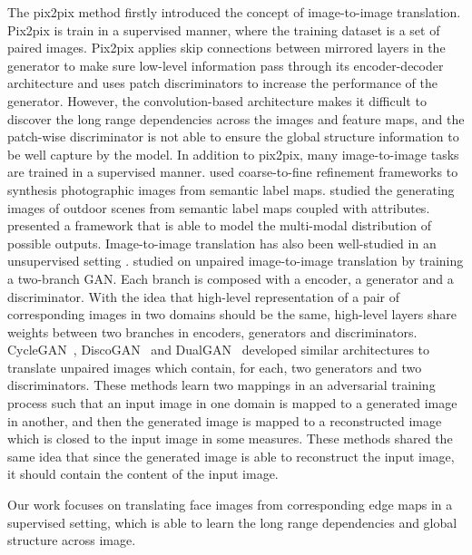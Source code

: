 The pix2pix method \cite{pix2pix} firstly introduced the concept of image-to-image translation. Pix2pix is train in a supervised manner, where the training dataset is a set of paired images. 
Pix2pix applies skip connections \cite{Unet} between mirrored layers in the generator to make sure low-level information pass through its encoder-decoder architecture and uses patch discriminators \cite{PatchDicriminator} to increase the performance of the generator. However, the convolution-based architecture makes it difficult to discover the long range dependencies across the images and feature maps, and the patch-wise discriminator is not able to ensure the global structure information to be well capture by the model.
%
In addition to pix2pix, many image-to-image tasks \cite{See pix2pixHD} are trained in a supervised manner. 
\cite{CascadedGANs, pix2pixHD} used coarse-to-fine refinement frameworks to synthesis photographic images from semantic label maps. 
\cite{pix2pixHD-25} studied the generating images of outdoor scenes from semantic label maps coupled with attributes.
\cite{BicycleGANs} presented a framework that is able to model the multi-modal distribution of possible outputs.
%
%
Image-to-image translation has also been well-studied in an unsupervised setting \cite{See pix2pixHD}.
\cite{UNIT} studied on unpaired image-to-image translation by training a two-branch GAN. Each branch is composed with a encoder, a generator and a discriminator. With the idea that high-level representation of a pair of corresponding images in two domains should be the same, high-level layers share weights between two branches in encoders, generators and discriminators. 
%
CycleGAN~\cite{CycleGAN}, DiscoGAN~\cite{DiscoGAN} and DualGAN~\cite{DualGAN} developed similar architectures to translate unpaired images which contain, for each, two generators and two discriminators. These methods learn two mappings in an adversarial training process such that an input image in one domain is mapped to a generated image in another, and then the generated image is mapped to a reconstructed image which is closed to the input image in some measures. These methods shared the same idea that since the generated image is able to reconstruct the input image, it should contain the content of the input image. 

Our work focuses on translating face images from corresponding edge maps in a supervised setting, which is able to learn the long range dependencies and global structure across image.


